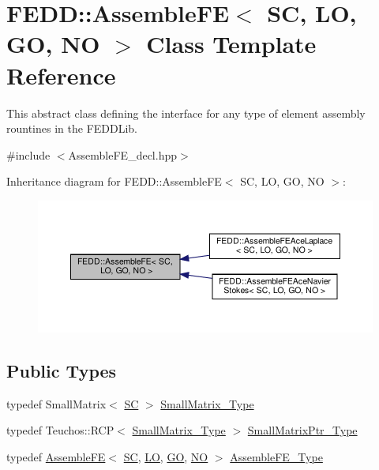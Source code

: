 \hypertarget{classFEDD_1_1AssembleFE}{}\section{F\+E\+DD\+:\+:Assemble\+FE$<$ SC, LO, GO, NO $>$ Class Template Reference}
\label{classFEDD_1_1AssembleFE}


This abstract class defining the interface for any type of element assembly rountines in the F\+E\+D\+D\+Lib.  




{\ttfamily \#include $<$Assemble\+F\+E\+\_\+decl.\+hpp$>$}



Inheritance diagram for F\+E\+DD\+:\+:Assemble\+FE$<$ SC, LO, GO, NO $>$\+:\nopagebreak
\begin{figure}[H]
\begin{center}
\leavevmode
\includegraphics[width=350pt]{classFEDD_1_1AssembleFE__inherit__graph}
\end{center}
\end{figure}
\subsection*{Public Types}
\begin{DoxyCompactItemize}
\item 
typedef Small\+Matrix$<$ \hyperlink{fe__test__laplace_8cpp_a79c7e86a57edbb2a5a53242bcd04e41e}{SC} $>$ \hyperlink{classFEDD_1_1AssembleFE_a8b8c588ba0cfaa200a74215f19e62722}{Small\+Matrix\+\_\+\+Type}
\item 
typedef Teuchos\+::\+R\+CP$<$ \hyperlink{classFEDD_1_1AssembleFE_a8b8c588ba0cfaa200a74215f19e62722}{Small\+Matrix\+\_\+\+Type} $>$ \hyperlink{classFEDD_1_1AssembleFE_afb5fb5dca3aab59f697a25884e99e894}{Small\+Matrix\+Ptr\+\_\+\+Type}
\item 
typedef \hyperlink{classFEDD_1_1AssembleFE}{Assemble\+FE}$<$ \hyperlink{fe__test__laplace_8cpp_a79c7e86a57edbb2a5a53242bcd04e41e}{SC}, \hyperlink{fe__test__laplace_8cpp_ad6a38c9f07d3fd633eefca5bccad8410}{LO}, \hyperlink{fe__test__laplace_8cpp_afa2946b509009b4f45eb04bd8c5b27d9}{GO}, \hyperlink{fe__test__laplace_8cpp_a5e24f37b28787429872b6ecb1d0417ce}{NO} $>$ \hyperlink{classFEDD_1_1AssembleFE_ab2c8bb1fd65dfcf7899a7c4a4a8a4021}{Assemble\+F\+E\+\_\+\+Type}
\end{DoxyCompactItemize}
